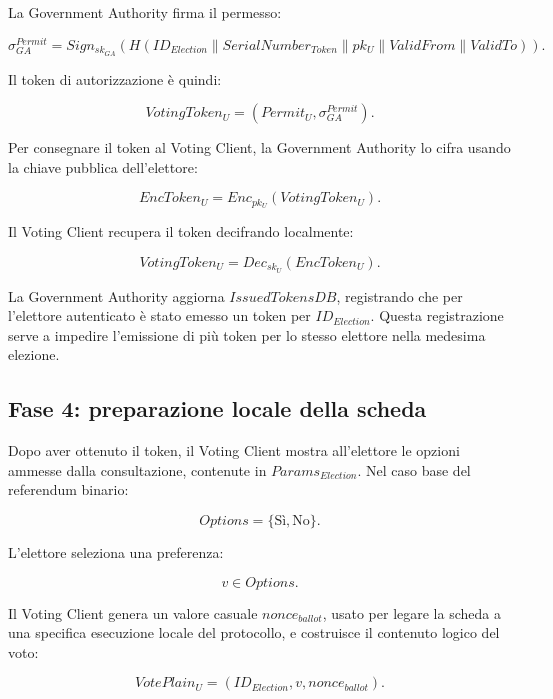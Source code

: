 \documentclass[a4paper,12pt]{article}
\begin{document}
La Government Authority firma il permesso:

\[
	\sigma_{GA}^{Permit} =
	Sign_{sk_{GA}}(H(ID_{Election} \parallel SerialNumber_{Token} \parallel pk_U \parallel ValidFrom \parallel ValidTo)).
\]

Il token di autorizzazione \`e quindi:

\[
	VotingToken_U =
	(Permit_U, \sigma_{GA}^{Permit}).
\]

Per consegnare il token al Voting Client, la Government Authority lo cifra usando la chiave pubblica dell'elettore:

\[
	EncToken_U =
	Enc_{pk_U}(VotingToken_U).
\]

Il Voting Client recupera il token decifrando localmente:

\[
	VotingToken_U =
	Dec_{sk_U}(EncToken_U).
\]

La Government Authority aggiorna \(IssuedTokensDB\), registrando che per l'elettore autenticato \`e stato emesso un token per \(ID_{Election}\). 
Questa registrazione serve a impedire l'emissione di pi\`u token per lo stesso elettore nella medesima elezione.

\subsection{Fase 4: preparazione locale della scheda}

Dopo aver ottenuto il token, il Voting Client mostra all'elettore le opzioni ammesse dalla consultazione, contenute in \(Params_{Election}\). 
Nel caso base del referendum binario:

\[
	Options = \{\text{S\`i}, \text{No}\}.
\]

L'elettore seleziona una preferenza:

\[
	v \in Options.
\]

Il Voting Client genera un valore casuale \(nonce_{ballot}\), usato per legare la scheda a una specifica esecuzione locale del protocollo, e costruisce il contenuto logico del voto:

\[
	VotePlain_U =
	(ID_{Election}, v, nonce_{ballot}).
\]
\end{document}
